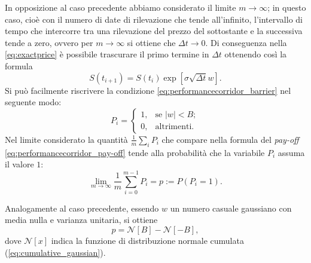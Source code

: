 In opposizione al caso precedente abbiamo considerato il limite $m \rightarrow \infty$; in questo caso, cioè con il numero di date di rilevazione che tende all'infinito, l'intervallo di tempo che intercorre tra una rilevazione del prezzo del sottostante e la successiva tende a zero, ovvero per $m \rightarrow \infty$ si ottiene che $\Delta t \rightarrow 0$. Di conseguenza nella \eqref{eq:exactprice} è possibile trascurare il primo termine in $\Delta t$ ottenendo così la formula
\begin{equation}
     S(t_{i+1}) = S(t_i) \exp{\left[ \sigma \sqrt{\Delta t} w\right]}.
\end{equation}
Si può facilmente riscrivere la condizione \eqref{eq:performancecorridor_barrier} nel seguente modo:
\begin{equation}
    P_i = \begin{cases}
    1, & \text{se} \,\,\left| w \right| < B;\\
    0, & \text{altrimenti}.
    \label{eq:condition_m}
  \end{cases}
\end{equation}
Nel limite considerato la quantità $ \frac{1}{m} \sum_{i}{P_i}$ che compare nella formula del \textit{pay-off} \eqref{eq:performancecorridor_pay-off} tende alla probabilità che la variabile $P_{i}$ assuma il valore $1$:
\begin{equation}
    \lim_{m \to \infty} \frac{1}{m} \sum_{i=0}^{m-1}{P_i} = p := P\left(P_{i}=1\right).
\end{equation}

Analogamente al caso precedente, essendo $w$ un numero casuale gaussiano con media nulla e varianza unitaria, si ottiene
\begin{equation}
    p = \mathcal{N}[B] - \mathcal{N}[-B],
\end{equation}
dove $\mathcal{N}[x]$ indica la funzione di distribuzione normale cumulata (\ref{eq:cumulative_gaussian}).

